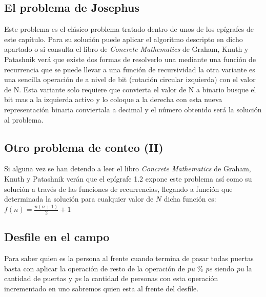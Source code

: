 \subsection{El problema de Josephus} Este problema es el clásico problema tratado dentro de unos de los epígrafes de este capítulo. Para su solución puede aplicar el algoritmo descripto en dicho apartado o si consulta el libro de \emph{Concrete Mathematics} de Graham, Knuth y Patashnik verá que existe dos formas de resolverlo una mediante una función de recurrencia que se puede llevar a una función de recursividad la otra variante es una sencilla operación de a nivel de bit (rotación circular izquierda) con el valor de N. Esta variante solo requiere que convierta el valor de N a binario busque el bit mas a la izquierda activo y lo coloque a la derecha con esta nueva representación binaria conviertala a decimal y el número obtenido será la solución al problema.

\subsection{Otro problema de conteo (II)}  Si alguna vez se han detendo a leer el libro \emph{Concrete Mathematics} de Graham, Knuth y Patashnik verán que el epígrafe 1.2 expone este problema así como su solución a través de las funciones de recurrencias, llegando a función que determinada la solución para cualquier valor de $N$  dicha función es: $ f(n) = \frac{n(n+1)}{2}+1$   

\subsection{Desfile en el campo}  Para saber quien es la persona al frente cuando termina de pasar todas puertas basta con aplicar  la operación de resto de la operación de \emph{pu} \% \emph{pe} siendo \emph{pu} la cantidad de puertas y \emph{pe} la cantidad de personas con esta operación incrementado en uno sabremos quien esta al frente del desfile.
